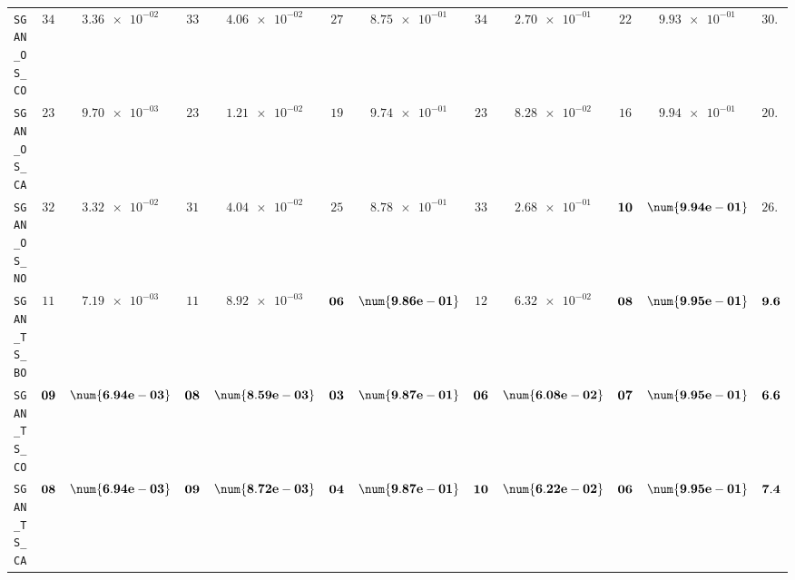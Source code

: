 \begin{table}[H]
\begin{tabularx}{\textwidth}{l||cC|cC|cC|cC|cC||c}
		\texttt{SGAN\_OS\_CO} & $ 34$ & $ \num{3.36e-02}$ & $ 33$ & $ \num{4.06e-02}$ & $ 27$ & $ \num{8.75e-01}$ & $ 34$ & $ \num{2.70e-01}$ & $ 22$ & $ \num{9.93e-01}$ & $ 30.0$  \\
		\texttt{SGAN\_OS\_CA} & $ 23$ & $ \num{9.70e-03}$ & $ 23$ & $ \num{1.21e-02}$ & $ 19$ & $ \num{9.74e-01}$ & $ 23$ & $ \num{8.28e-02}$ & $ 16$ & $ \num{9.94e-01}$ & $ 20.8$  \\
		\texttt{SGAN\_OS\_NO} & $ 32$ & $ \num{3.32e-02}$ & $ 31$ & $ \num{4.04e-02}$ & $ 25$ & $ \num{8.78e-01}$ & $ 33$ & $ \num{2.68e-01}$ & $\bf 10$ & $\bf \num{9.94e-01}$ & $ 26.2$  \\
		\texttt{SGAN\_TS\_BO} & $ 11$ & $ \num{7.19e-03}$ & $ 11$ & $ \num{8.92e-03}$ & $\bf 06$ & $\bf \num{9.86e-01}$ & $ 12$ & $ \num{6.32e-02}$ & $\bf 08$ & $\bf \num{9.95e-01}$ & $\bf 9.6$  \\
		\texttt{SGAN\_TS\_CO} & $\bf 09$ & $\bf \num{6.94e-03}$ & $\bf 08$ & $\bf \num{8.59e-03}$ & $\bf 03$ & $\bf \num{9.87e-01}$ & $\bf 06$ & $\bf \num{6.08e-02}$ & $\bf 07$ & $\bf \num{9.95e-01}$ & $\bf 6.6$  \\
		\texttt{SGAN\_TS\_CA} & $\bf 08$ & $\bf \num{6.94e-03}$ & $\bf 09$ & $\bf \num{8.72e-03}$ & $\bf 04$ & $\bf \num{9.87e-01}$ & $\bf 10$ & $\bf \num{6.22e-02}$ & $\bf 06$ & $\bf \num{9.95e-01}$ & $\bf 7.4$  \\

\end{tabularx}
\end{table}
